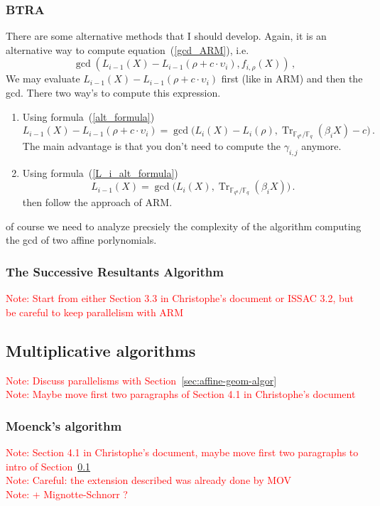 \documentclass{article}
\newcommand{\ff}[1]{\mathbb{F}_{#1}}
\newcommand{\qq}{q}
\newcommand{\nn}{n}
\newcommand{\qn}{{\qq^\nn}}
\newcommand{\basef}{\ff{\qq}}
\newcommand{\extf}{\ff{\qn}}
\DeclareMathOperator{\Tr}{Tr}
\newcounter{algo}
\newcommand{\Notes}[1]{\textcolor{red}{Note: #1}}
\begin{document}
\subsubsection{BTRA}


There are some alternative methods that I should develop. Again, it is an alternative way to compute equation~(\ref{gcd_ARM}), i.e.
$$\gcd(L_{i-1}(X)-L_{i-1}(\rho + c \cdot \upsilon_i),f_{i,\rho}(X)) \,,$$
We may evaluate $L_{i-1}(X)-L_{i-1}(\rho + c \cdot \upsilon_i)$ first (like in ARM) and then the gcd. There two way's to compute this expression.
\begin{enumerate}
\item Using formula~(\ref{alt_formula})
$$
L_{i-1}(X)-L_{i-1}(\rho +c \cdot \upsilon_i)=
\gcd\bigl(L_i(X)-L_i(\rho), \Tr_{\extf/\basef}(\beta_i X) -c  \bigr) \,.$$
The main advantage is that you don't need to compute the $\gamma_{i,j}$ anymore.
\item Using formula~(\ref{L_i_alt_formula})
$$ L_{i-1}(X)=\gcd\bigl(L_i(X),\Tr_{\extf/\basef}(\beta_i X )\bigr) \,.$$
 then follow the approach of ARM.
\end{enumerate}
of course we need to analyze precsiely the complexity of the algorithm computing the gcd of two affine porlynomials.


\subsubsection{The Successive Resultants Algorithm}
\label{sec:SRA}
\Notes{Start from either Section 3.3 in Christophe's document or ISSAC 3.2, but be careful to keep parallelism with ARM}












\subsection{Multiplicative algorithms}
\label{sec:mult-algor}
\Notes{Discuss parallelisms with Section~\ref{sec:affine-geom-algor}}\\
\noindent\Notes{Maybe move first two paragraphs of Section 4.1 in Christophe's document}

\subsubsection{Moenck's algorithm}
\label{sec:Moenck}
\Notes{Section 4.1 in Christophe's document, maybe move first two paragraphs to intro of Section~\ref{sec:mult-algor}}\\
\noindent \Notes{Careful: the extension described was already done by MOV}\\
\noindent\Notes{+ Mignotte-Schnorr ?}
\end{document}

